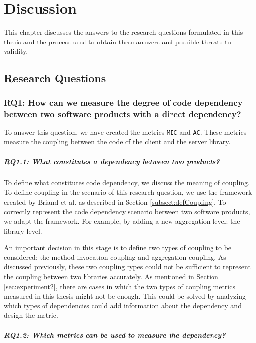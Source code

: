 \chapter{Discussion}\label{ch:Discussion}
This chapter discusses the answers to the research questions formulated in this thesis and the process used to obtain these answers and possible threats to validity.

\section{Research Questions}

\subsection{RQ1: How can we measure the degree of code dependency between two software products with a direct dependency?}

To answer this question, we have created the metrics \texttt{MIC} and \texttt{AC}. These metrics measure the coupling between the code of the client and the server library.

\paragraph{RQ1.1: What constitutes a dependency between two products?}

To define what constitutes code dependency, we discuss the meaning of coupling. To define coupling in the scenario of this research question, we use the framework created by Briand et al. \cite{briand1999unified} as described in Section \ref{subsect:defCoupling}. To correctly represent the code dependency scenario between two software products, we adapt the framework. For example, by adding a new aggregation level: the library level.

An important decision in this stage is to define two types of coupling to be considered: the method invocation coupling and aggregation coupling. As discussed previously, these two coupling types could not be sufficient to represent the coupling between two libraries accurately. As mentioned in Section \ref{sec:experiment2}, there are cases in which the two types of coupling metrics measured in this thesis might not be enough. This could be solved by analyzing which types of dependencies could add information about the dependency and design the metric.

\paragraph{RQ1.2: Which metrics can be used to measure the dependency?}

